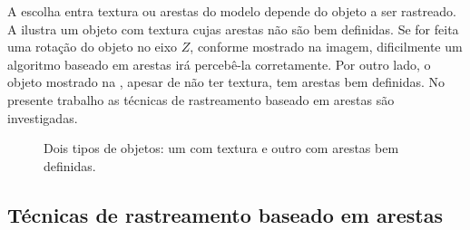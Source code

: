 A escolha entra textura ou arestas do modelo depende do objeto a ser rastreado. A  ilustra um objeto com textura cujas arestas não são bem definidas. Se for feita uma rotação do objeto no eixo $Z$, conforme mostrado na imagem, dificilmente um algoritmo baseado em arestas irá percebê-la corretamente. Por outro lado, o objeto mostrado na , apesar de não ter textura, tem arestas bem definidas. No presente trabalho as técnicas de rastreamento baseado em arestas são investigadas.

\begin{figure}[!ht]
	\centerline{
		\hfil
	}
	\caption{Dois tipos de objetos: um com textura e outro com arestas bem definidas.}
\end{figure}

\subsection{Técnicas de rastreamento baseado em arestas}

